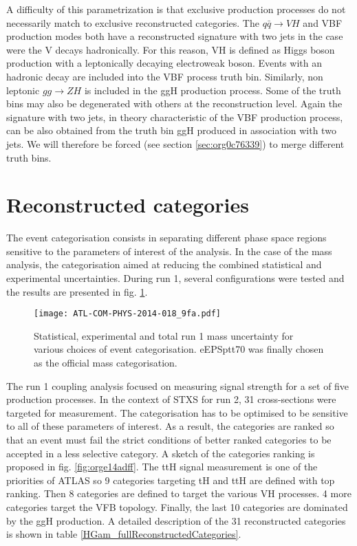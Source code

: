 \begin{enumerate}
A difficulty of this parametrization is that exclusive production processes do not necessarily match to exclusive reconstructed categories.
The \(q\bar{q}\rightarrow VH\) and VBF production modes both have a reconstructed signature with two jets in the case were the V decays hadronically.
For this reason, VH is defined as Higgs boson production with a leptonically decaying electroweak boson.
Events with an hadronic decay are included into the VBF process truth bin.
Similarly, non leptonic \(gg\rightarrow ZH\) is included in the ggH production process.
Some of the truth bins may also be degenerated with others at the reconstruction level.
Again the signature with two jets, in theory characteristic of the VBF production process, can be also obtained from the truth bin ggH produced in association with two jets.
We will therefore be forced (see section \ref{sec:org0c76339}) to merge different truth bins.
\end{enumerate}



\section{Reconstructed categories}
\label{sec:orgdbf5aa8}
\label{HGam_RecCateg}
The event categorisation consists in separating different phase space regions sensitive to the parameters of interest of the analysis.
In the case of the mass analysis, the categorisation aimed at reducing the combined statistical and experimental uncertainties.
During run 1, several configurations were tested and the results are presented in fig. \ref{fig:org9ced173}.

\begin{figure}[htbp]
\centering
\texttt{[image: ATL-COM-PHYS-2014-018\_9fa.pdf]}
\caption{\label{fig:org9ced173}
  Statistical, experimental and total run 1 mass uncertainty for various choices of event categorisation.
  eEPSptt70 was finally chosen as the official mass categorisation.
  \cite{ATL-COM-PHYS-2014-018}}
\end{figure}


The run 1 coupling analysis focused on measuring signal strength for a set of five production processes.
In the context of STXS for run 2, 31 cross-sections were targeted for measurement.
The categorisation has to be optimised to be sensitive to all of these parameters of interest.
As a result, the categories are ranked so that an event must fail the strict conditions of better ranked categories to be accepted in a less selective category.
A sketch of the categories ranking is proposed in fig. \ref{fig:orge14adff}.
The ttH signal measurement is one of the priorities of ATLAS so 9 categories targeting tH and ttH are defined with top ranking.
Then 8 categories are defined to target the various VH processes.
4 more categories target the VFB topology.
Finally, the last 10 categories are dominated by the ggH production.
A detailed description of the 31 reconstructed categories is shown in table \ref{HGam_fullReconstructedCategories}.

